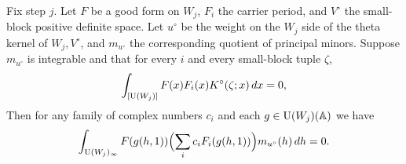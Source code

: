 \begin{lemma}
\label{lem:c-kernel-real-vanishing}
\emitthmsource
Fix step $j$. Let $F$ be a good form on $W_j$, $F_i$ the carrier period, and $V^\circ$ the small-block positive definite space. Let $u^\circ$ be the weight on the $W_j$ side of the theta kernel of $W_j,V^\circ$, and $m_{u^\circ}$ the corresponding quotient of principal minors. Suppose $m_{u^\circ}$ is integrable and that for every $i$ and every small-block tuple $\zeta$,
\[
  \int_{[\operatorname{U}(W_j)]} F(x) F_i(x) K^\circ(\zeta;x)\,dx=0,
\]
Then for any family of complex numbers $c_i$ and each $g\in \operatorname{U}(W_j)(\mathbb A)$ we have
\[
  \int_{\operatorname{U}(W_j)_\infty}
     F(g(h,1))\Bigl(\sum_i c_i F_i(g(h,1))\Bigr)m_{u^\circ}(h)\,dh=0.
\]
\end{lemma}

